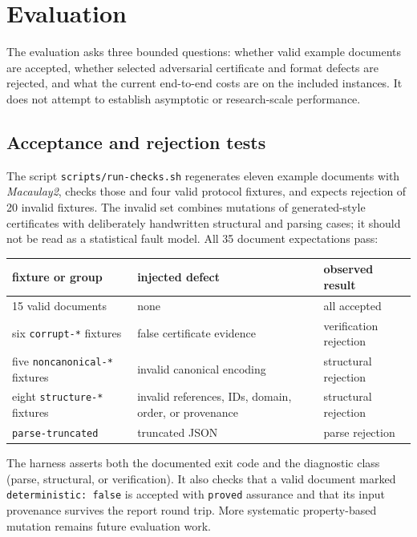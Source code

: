 \documentclass[11pt]{article}
\newcommand{\proved}{\textcolor{okgreen}{\code{proved}}}
\newcommand{\M}{\textit{Macaulay2}}
\newcommand{\code}[1]{\texttt{#1}}
\begin{document}
\section{Evaluation}\label{sec:experiments}

The evaluation asks three bounded questions: whether valid example
documents are accepted, whether selected adversarial certificate and format
defects are rejected, and what the current end-to-end costs are on the
included instances.  It does not attempt to establish asymptotic or
research-scale performance.

\subsection{Acceptance and rejection tests}

The script \code{scripts/run-checks.sh} regenerates eleven example
documents with \M{}, checks those and four valid protocol fixtures,
and expects rejection of 20 invalid fixtures.  The invalid set
combines mutations of generated-style certificates with deliberately
handwritten structural and parsing cases; it should not be read as a
statistical fault model.  All 35 document expectations pass:

\begin{center}
\small
\begin{tabular}{@{}lp{}l@{}}
\toprule
fixture or group & injected defect & observed result \\
\midrule
15 valid documents & none & all \textcolor{okgreen}{accepted} \\
six \code{corrupt-*} fixtures & false certificate evidence & \textcolor{badred}{verification rejection} \\
five \code{noncanonical-*} fixtures & invalid canonical encoding & \textcolor{badred}{structural rejection} \\
eight \code{structure-*} fixtures & invalid references, IDs, domain, order, or provenance & \textcolor{badred}{structural rejection} \\
\code{parse-truncated} & truncated JSON & \textcolor{badred}{parse rejection} \\
\bottomrule
\end{tabular}
\end{center}

The harness asserts both the documented exit code and the diagnostic
class (parse, structural, or verification).  It also checks that a valid
document marked \code{deterministic: false} is accepted with \proved{}
assurance and that its input provenance survives the report round trip.
More systematic property-based mutation remains future evaluation work.
\end{document}
